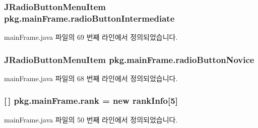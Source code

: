 \subsubsection[{\texorpdfstring{radio\+Button\+Intermediate}{radioButtonIntermediate}}]{\setlength{\rightskip}{0pt plus 5cm}J\+Radio\+Button\+Menu\+Item pkg.\+main\+Frame.\+radio\+Button\+Intermediate\hspace{0.3cm}{\ttfamily [private]}}\hypertarget{classpkg_1_1main_frame_ae0f421df54f124f20ade63f63bf53ccc}{}\label{classpkg_1_1main_frame_ae0f421df54f124f20ade63f63bf53ccc}


main\+Frame.\+java 파일의 69 번째 라인에서 정의되었습니다.

\subsubsection[{\texorpdfstring{radio\+Button\+Novice}{radioButtonNovice}}]{\setlength{\rightskip}{0pt plus 5cm}J\+Radio\+Button\+Menu\+Item pkg.\+main\+Frame.\+radio\+Button\+Novice\hspace{0.3cm}{\ttfamily [private]}}\hypertarget{classpkg_1_1main_frame_a13b463f756bd15fbba342d2a810b0953}{}\label{classpkg_1_1main_frame_a13b463f756bd15fbba342d2a810b0953}


main\+Frame.\+java 파일의 68 번째 라인에서 정의되었습니다.

\subsubsection[{\texorpdfstring{rank}{rank}}]{ \mbox{[}$\,$\mbox{]} pkg.\+main\+Frame.\+rank = new {\bf rank\+Info}\mbox{[}5\mbox{]}\hspace{0.3cm}{\ttfamily [private]}}\hypertarget{classpkg_1_1main_frame_a4a021c36a28ece6900f13d2254e13a96}{}\label{classpkg_1_1main_frame_a4a021c36a28ece6900f13d2254e13a96}


main\+Frame.\+java 파일의 50 번째 라인에서 정의되었습니다.

